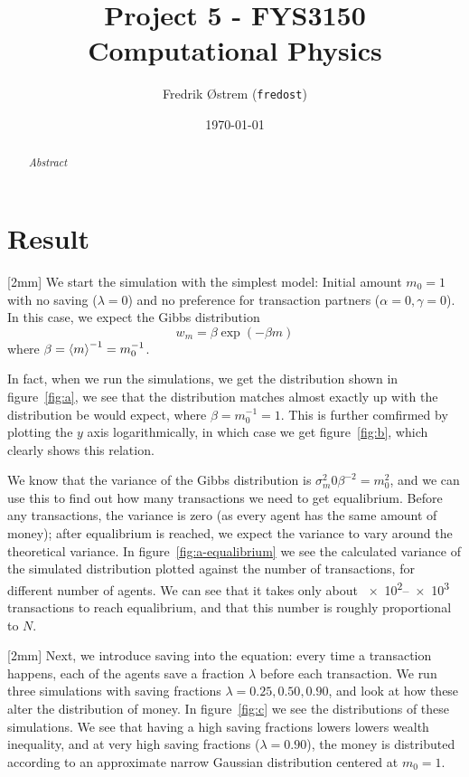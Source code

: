 \documentclass[12pt,a4paper]{article}
\newcommand\oppg[1]{\reversemarginnote{\textcolor{black!40}{#1)}}[2mm]}
\begin{document}
\title{Project 5 - FYS3150 Computational Physics}
\author{Fredrik Østrem (\texttt{fredost})}
\date{\today}

\maketitle

\begin{abstract}
  \textit{Abstract}
\end{abstract}

\tableofcontents

\clearpage

\section{Result}

\oppg{a,b}
We start the simulation with the simplest model: Initial amount $m_0 = 1$ with no saving ($\lambda = 0$) and no preference for transaction partners ($\alpha = 0, \gamma = 0$). In this case, we expect the Gibbs distribution
\begin{equation}
  w_m = \beta \exp(-\beta m)
\end{equation}
where $\beta = \expval{m}^{-1} = m_0^{-1}$.

In fact, when we run the simulations, we get the distribution shown in figure~\ref{fig:a}, we see that the distribution matches almost exactly up with the distribution be would expect, where $\beta = m_0^{-1} = 1$. This is further comfirmed by plotting the $y$ axis logarithmically, in which case we get figure~\ref{fig:b}, which clearly shows this relation.

We know that the variance of the Gibbs distribution is $\sigma_m^2 0 \beta^{-2} = m_0^2$, and we can use this to find out how many transactions we need to get equalibrium. Before any transactions, the variance is zero (as every agent has the same amount of money); after equalibrium is reached, we expect the variance to vary around the theoretical variance.
In figure~\ref{fig:a-equalibrium} we see the calculated variance of the simulated distribution plotted against the number of transactions, for different number of agents. We can see that it takes only about \numrange{e2}{e3} transactions to reach equalibrium, and that this number is roughly proportional to $N$.

\oppg{c}
Next, we introduce saving into the equation: every time a transaction happens, each of the agents save a fraction $\lambda$ before each transaction. We run three simulations with saving fractions $\lambda = 0.25, 0.50, 0.90$, and look at how these alter the distribution of money. In figure~\ref{fig:c} we see the distributions of these simulations. We see that having a high saving fractions lowers lowers wealth inequality, and at very high saving fractions ($\lambda = 0.90$), the money is distributed according to an approximate narrow Gaussian distribution centered at $m_0 = 1$.
\end{document}
